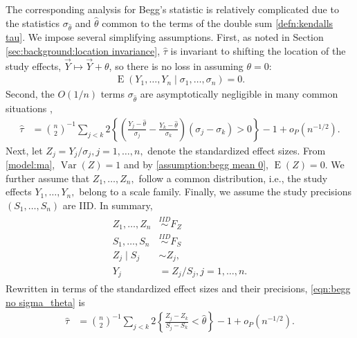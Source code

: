 \documentclass[12pt]{article}
\newcommand{\z}{Z}
\newcommand{\s}{S}
\newcommand{\y}{Y}
\DeclareMathOperator{\E}{E}
\DeclareMathOperator{\var}{Var}
\begin{document}
The corresponding analysis for Begg's statistic is relatively complicated due to the statistics 
$\sigma_{\hat\theta}$ and $\hat\theta$ common to the terms of the
double sum \eqref{defn:kendalls tau}. We impose several simplifying assumptions. %
 First, as noted in Section \ref{sec:background:location invariance},
$\hat\tau$ is invariant to shifting the location of the study effects,
$\vec\y\mapsto\vec\y+\theta$, so there is no loss in assuming
$\theta=0$:
\begin{align}
  \E(\y_1,\ldots,\y_n \mid \sigma_1,\ldots,\sigma_n) = 0.
  \label{assumption:begg mean 0}
\end{align}
Second, the $O(1/n)$ terms $\sigma_{\hat\theta}$ are asymptotically negligible
in many common situations \citep{michael:inpress-a},
\begin{align}
  \hat\tau &= {n\choose 2}^{-1}\sum_{j<k}2\left\{\left(\frac{\y_j-\hat\theta}{\sigma_j}-\frac{\y_k-\hat\theta}{\sigma_k}\right)(\sigma_j-\sigma_k)>0\right\}-1 + o_P(n^{-1/2}).
      \label{eqn:begg no sigma_theta}
\end{align}
Next, let $\z_j=\y_j/\sigma_j,j=1,\ldots,n,$ denote the standardized effect
sizes. From \eqref{model:ma}, $\var(\z)=1$ and by \eqref{assumption:begg mean 0}, $\E(\z)=0$. We further assume that 
$\z_1,\ldots,\z_n,$ follow a common distribution, i.e., the study
effects $\y_1,\ldots,\y_n,$ belong to a scale family. Finally, we assume the study precisions $(\s_1,\ldots,\s_n)$ are IID. %
In summary,
\begin{align}
    \label{model:scale}
  \begin{split}
    \z_1,\ldots,\z_n &\overset{IID}{\sim} F_Z\\
    \s_1,\ldots,\s_n &\overset{IID}{\sim}  F_S\\
    \z_j \mid \s_j &\sim \z_j,\\
    \y_j&=\z_j/\s_j,j=1,\ldots,n.
  \end{split}
\end{align}
Rewritten in
terms of the standardized effect sizes and their precisions, \eqref{eqn:begg no sigma_theta} is
\begin{align}
  \hat\tau &=  {n\choose 2}^{-1}\sum_{j<k}2\left\{\frac{\z_j-\z_k}{\s_j-\s_k}<\hat\theta\right\}-1 + o_P(n^{-1/2}).
             \label{eqn:begg simplified}
\end{align}
\end{document}
